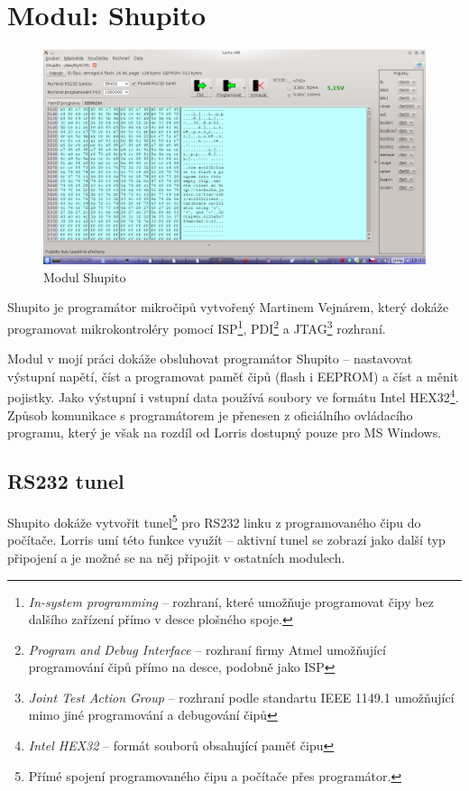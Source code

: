 \documentclass[12pt, a4paper, oneside]{article}
\newcommand{\It}{\textit}  %
\begin{document}
\section{Modul: Shupito}
\begin{figure}[h]
\begin{center}
\includegraphics[width=\textwidth]{img/shupito.png}
\caption{Modul Shupito}
\label{Shupito}
\end{center}
\end{figure}
Shupito je programátor mikročipů vytvořený Martinem Vejnárem, který dokáže programovat mikrokontroléry pomocí ISP\footnote{\It{In-system programming} -- rozhraní, které umožňuje programovat čipy bez dalšího zařízení přímo v desce plošného spoje.}, PDI\footnote{\It{Program and Debug Interface} -- rozhraní firmy Atmel umožňující programování čipů přímo na desce, podobně jako ISP} a JTAG\footnote{\It{Joint Test Action Group} -- rozhraní podle standartu IEEE 1149.1 umožňující mimo jiné programování a debugování čipů} rozhraní. 

Modul v mojí práci dokáže obsluhovat programátor Shupito -- nastavovat výstupní napětí, číst a programovat paměť čipů (flash i EEPROM) a číst a měnit pojistky. Jako výstupní i vstupní data používá soubory ve formátu Intel HEX32\footnote{\It{Intel HEX32} -- formát souborů obsahující paměť čipu}. 
Způsob komunikace s programátorem je přenesen z oficiálního ovládacího programu\cite{avr232client}, který je však na rozdíl od Lorris dostupný pouze pro MS Windows.

\subsection{RS232 tunel}
\label{tunel}
Shupito dokáže vytvořit tunel\footnote{Přímé spojení programovaného čipu a počítače přes programátor.} pro RS232 linku z programovaného čipu do počítače. Lorris umí této funkce využít -- aktivní tunel se zobrazí jako další typ připojení a je možné se na něj připojit v ostatních modulech.
\end{document}
